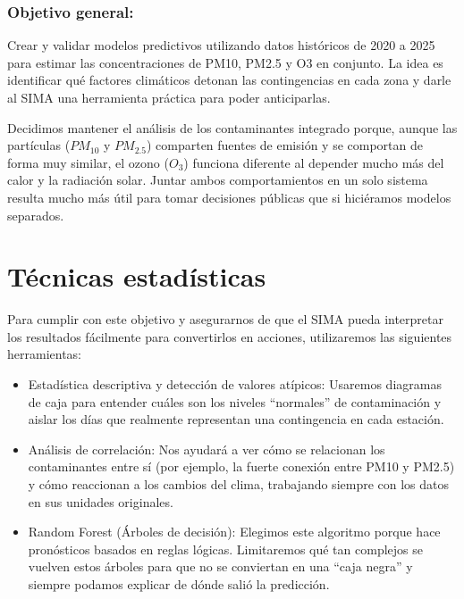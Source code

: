 \documentclass[
  11pt,
  letterpaper,
]{article}
\begin{document}
\subsubsection{Objetivo general:}\label{objetivo-general}

Crear y validar modelos predictivos utilizando datos históricos de 2020
a 2025 para estimar las concentraciones de PM10, PM2.5 y O3 en conjunto.
La idea es identificar qué factores climáticos detonan las contingencias
en cada zona y darle al SIMA una herramienta práctica para poder
anticiparlas.

Decidimos mantener el análisis de los contaminantes integrado porque,
aunque las partículas (\(PM_{10}\) y \(PM_{2.5}\)) comparten fuentes de
emisión y se comportan de forma muy similar, el ozono (\(O_{3}\))
funciona diferente al depender mucho más del calor y la radiación solar.
Juntar ambos comportamientos en un solo sistema resulta mucho más útil
para tomar decisiones públicas que si hiciéramos modelos separados.

\section{Técnicas estadísticas}\label{tuxe9cnicas-estaduxedsticas}

Para cumplir con este objetivo y asegurarnos de que el SIMA pueda
interpretar los resultados fácilmente para convertirlos en acciones,
utilizaremos las siguientes herramientas:

\begin{itemize}
\item
  Estadística descriptiva y detección de valores atípicos: Usaremos
  diagramas de caja para entender cuáles son los niveles ``normales'' de
  contaminación y aislar los días que realmente representan una
  contingencia en cada estación.
\item
  Análisis de correlación: Nos ayudará a ver cómo se relacionan los
  contaminantes entre sí (por ejemplo, la fuerte conexión entre PM10 y
  PM2.5) y cómo reaccionan a los cambios del clima, trabajando siempre
  con los datos en sus unidades originales.
\item
  Random Forest (Árboles de decisión): Elegimos este algoritmo porque
  hace pronósticos basados en reglas lógicas. Limitaremos qué tan
  complejos se vuelven estos árboles para que no se conviertan en una
  ``caja negra'' y siempre podamos explicar de dónde salió la
  predicción.
\end{itemize}
\end{document}
